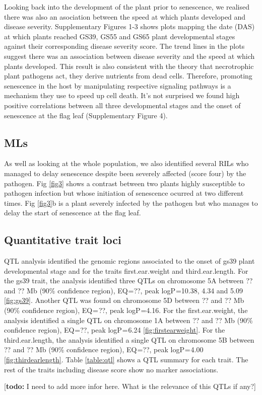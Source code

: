 \documentclass{frontiersSCNS} %
\newcommand{\todo}[1]{
  \rule{0pt}{0pt}\marginpar{{\color{blue}\rule{1ex}{1ex}}}
  {[\textbf{\color{blue}todo:} #1]}}
\begin{document}
Looking back into the development of the plant prior to senescence, we realised there was also an asociation between the speed at which plants developed and disease severity. Supplementary Figures 1-3 shows plots mapping the date (DAS) at which plants reached GS39, GS55 and GS65 plant developmental stages against their corresponding disease severity score. The trend lines in the plots suggest there was an association between disease severity and the speed at which plants developed. This result is also consistent with the theory that necrotrophic plant pathogens act, they derive nutrients from dead cells. Therefore, promoting senescence in the host by manipulating respective signaling pathways is a mechanism they use to speed up cell death. It's not surprised we found high positive correlations between all three developmental stages and the onset of senescence at the flag leaf (Supplementary Figure 4).

\subsection{MLs}

As well as looking at the whole population, we also identified several RILs who managed to delay senescence despite been severely affected (score four) by the pathogen. Fig \ref{fig3} shows a contrast between two plants highly susceptible to pathogen infection but whose initiation of senescence ocurred at two different times. Fig \ref{fig3}b is a plant severely infected by the pathogen but who manages to delay the start of senescence at the flag leaf. 

\subsection{Quantitative trait loci}

QTL analysis identified the genomic regions associated to the onset of gs39 plant developmental stage and for the traits first.ear.weight and third.ear.length. For the gs39 trait, the analysis identified three QTLs on chromosome 5A between ?? and ?? Mb (90\% confidence region), EQ =??, peak logP =10.38, 4.34 and 5.09 \ref{fig:gs39}. Another QTL was found on chromosome 5D between ?? and ?? Mb (90\% confidence region), EQ = ??, peak logP =4.16. For the first.ear.weight,  the analysis identified a single QTL on chromosome 1A between ?? and ?? Mb (90\% confidence region), EQ =??, peak logP = 6.24 \ref{fig:firstearweight}. For the third.ear.length,  the analysis identified a single QTL on chromosome 5B between ?? and ?? Mb (90\% confidence region), EQ =??, peak logP = 4.00 \ref{fig:thirdearlength}. Table \ref{table:qtl} shows a QTL summary for each trait. The rest of the traits including disease score show no marker associations. 
\todo{I need to add more infor here. What is the relevance of this QTLs if any?}
\end{document}
